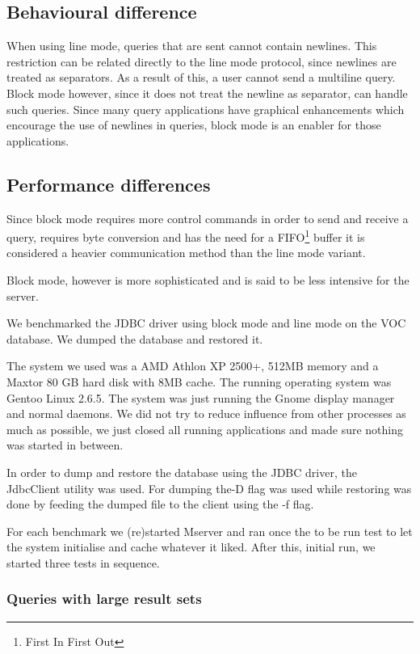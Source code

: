 \documentclass{article}
\begin{document}
\subsection{Behavioural difference}

When using line mode, queries that are sent cannot contain newlines.
This restriction can be related directly to the line mode protocol, since
newlines are treated as separators. As a result of this, a user cannot
send a multiline query. Block mode however, since it does not treat
the newline as separator, can handle such queries. Since many
query applications have graphical enhancements which encourage
the use of newlines in queries, block mode is an enabler for those
applications.


\subsection{Performance differences}

Since block mode requires more control commands in order to send and
receive a query, requires byte conversion and has the need for a
FIFO\footnote{First In First Out} buffer it is considered a heavier
communication method than the line mode variant.

Block mode, however is more sophisticated and is said to be less
intensive for the server.

We benchmarked the JDBC driver using block mode and line mode on
the VOC database. We dumped the database and restored it.

The system we used was a AMD Athlon XP 2500+, 512MB memory
and a Maxtor 80 GB hard disk with 8MB cache. The running operating
system was Gentoo Linux 2.6.5. The system was just running the
Gnome display manager and normal daemons. We did not try to
reduce influence from other processes as much as possible, we just
closed all running applications and made sure nothing was started
in between.

In order to dump and restore the database using the JDBC driver, the
\textsf{JdbcClient} utility was used. For dumping the\textsf{-D} flag
was used while restoring was done by feeding the dumped file to the
client using the \textsf{-f} flag.

For each benchmark we (re)started Mserver and ran once the to be
run test to let the system initialise and cache whatever it liked.
After this, initial run, we started three tests in sequence.
 

\subsubsection{Queries with large result sets}
\end{document}
